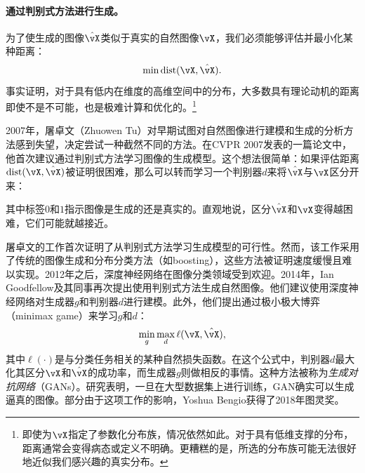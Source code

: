 \documentclass[../../book-main_zh.tex]{subfiles}
\begin{document}
\paragraph{通过判别式方法进行生成。}
为了使生成的图像\(\hat{\vX}\)类似于真实的自然图像\(\vX\)，我们必须能够评估并最小化某种距离：
\begin{equation}
    \min \operatorname{dist}(\vX, \hat{\vX}).
\end{equation}
事实证明，对于具有低内在维度的高维空间中的分布，大多数具有理论动机的距离即使不是不可能，也是极难计算和优化的。\footnote{即使为\(\vX\)指定了参数化分布族，情况依然如此。对于具有低维支撑的分布，距离通常会变得病态或定义不明确。更糟糕的是，所选的分布族可能无法很好地近似我们感兴趣的真实分布。}

2007年，屠卓文（Zhuowen Tu）对早期试图对自然图像进行建模和生成的分析方法感到失望，决定尝试一种截然不同的方法。在CVPR
2007发表的一篇论文中\cite{Tu-2007}，他首次建议通过判别式方法学习图像的生成模型。这个想法很简单：如果评估距离\(\operatorname{dist}(\vX,
\hat{\vX})\)被证明很困难，那么可以转而学习一个判别器\(d\)来将\(\hat{\vX}\)与\(\vX\)区分开来：
\begin{figure}[h!]
    \centering
    \label{fig:gan-networks}
\end{figure}
其中标签\(0\)和\(1\)指示图像是生成的还是真实的。直观地说，区分\(\hat{\vX}\)和\(\vX\)变得越困难，它们可能就越接近。

屠卓文的工作\cite{Tu-2007}首次证明了从判别式方法学习生成模型的可行性。然而，该工作采用了传统的图像生成和分布分类方法（如boosting），这些方法被证明速度缓慢且难以实现。2012年之后，深度神经网络在图像分类领域受到欢迎。2014年，Ian
Goodfellow及其同事再次提出使用判别式方法生成自然图像\cite{Goodfellow-2014}。他们建议使用深度神经网络对生成器\(g\)和判别器\(d\)进行建模。此外，他们提出通过极小极大博弈（minimax
game）来学习\(g\)和\(d\)：
\begin{equation}
    \min_{g} \max_{d} \ell(\vX, \hat{\vX}),
\end{equation}
其中\(\ell(\cdot)\)是与分类任务相关的某种自然损失函数。在这个公式中，判别器\(d\)最大化其区分\(\vX\)和\(\hat{\vX}\)的成功率，而生成器\(g\)则做相反的事情。这种方法被称为\textit{生成对抗网络}（GANs）。研究表明，一旦在大型数据集上进行训练，GAN确实可以生成逼真的图像。部分由于这项工作的影响，Yoshua
Bengio获得了2018年图灵奖。
\end{document}
